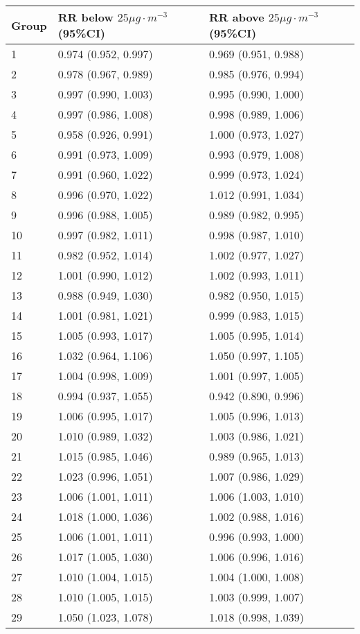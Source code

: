 \begin{tabular}{lll}
  \hline
Group & RR below $25 \mu g \cdot m^{-3}$ (95\%CI) & RR above $25 \mu g \cdot m^{-3}$ (95\%CI) \\ 
  \hline
   1 & 0.974 (0.952, 0.997) & 0.969 (0.951, 0.988) \\ 
     2 & 0.978 (0.967, 0.989) & 0.985 (0.976, 0.994) \\ 
     3 & 0.997 (0.990, 1.003) & 0.995 (0.990, 1.000) \\ 
     4 & 0.997 (0.986, 1.008) & 0.998 (0.989, 1.006) \\ 
     5 & 0.958 (0.926, 0.991) & 1.000 (0.973, 1.027) \\ 
     6 & 0.991 (0.973, 1.009) & 0.993 (0.979, 1.008) \\ 
     7 & 0.991 (0.960, 1.022) & 0.999 (0.973, 1.024) \\ 
     8 & 0.996 (0.970, 1.022) & 1.012 (0.991, 1.034) \\ 
     9 & 0.996 (0.988, 1.005) & 0.989 (0.982, 0.995) \\ 
    10 & 0.997 (0.982, 1.011) & 0.998 (0.987, 1.010) \\ 
    11 & 0.982 (0.952, 1.014) & 1.002 (0.977, 1.027) \\ 
    12 & 1.001 (0.990, 1.012) & 1.002 (0.993, 1.011) \\ 
    13 & 0.988 (0.949, 1.030) & 0.982 (0.950, 1.015) \\ 
    14 & 1.001 (0.981, 1.021) & 0.999 (0.983, 1.015) \\ 
    15 & 1.005 (0.993, 1.017) & 1.005 (0.995, 1.014) \\ 
    16 & 1.032 (0.964, 1.106) & 1.050 (0.997, 1.105) \\ 
    17 & 1.004 (0.998, 1.009) & 1.001 (0.997, 1.005) \\ 
    18 & 0.994 (0.937, 1.055) & 0.942 (0.890, 0.996) \\ 
    19 & 1.006 (0.995, 1.017) & 1.005 (0.996, 1.013) \\ 
    20 & 1.010 (0.989, 1.032) & 1.003 (0.986, 1.021) \\ 
    21 & 1.015 (0.985, 1.046) & 0.989 (0.965, 1.013) \\ 
    22 & 1.023 (0.996, 1.051) & 1.007 (0.986, 1.029) \\ 
    23 & 1.006 (1.001, 1.011) & 1.006 (1.003, 1.010) \\ 
    24 & 1.018 (1.000, 1.036) & 1.002 (0.988, 1.016) \\ 
    25 & 1.006 (1.001, 1.011) & 0.996 (0.993, 1.000) \\ 
    26 & 1.017 (1.005, 1.030) & 1.006 (0.996, 1.016) \\ 
    27 & 1.010 (1.004, 1.015) & 1.004 (1.000, 1.008) \\ 
    28 & 1.010 (1.005, 1.015) & 1.003 (0.999, 1.007) \\ 
    29 & 1.050 (1.023, 1.078) & 1.018 (0.998, 1.039) \\ 
   \hline
\end{tabular}

